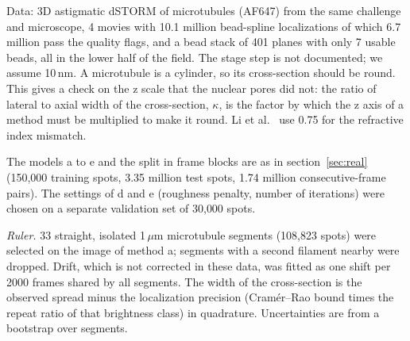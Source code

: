 \documentclass[11pt,a4paper]{article}
\begin{document}
Data: 3D astigmatic dSTORM of microtubules (AF647) from the same challenge and microscope, 4 movies with
10.1 million bead-spline localizations of which 6.7 million pass the quality flags, and a bead stack of 401
planes with only 7 usable beads, all in the lower half of the field. The stage step is not documented; we
assume 10\,nm. A microtubule is a cylinder, so its cross-section should be round. This gives a check on the z
scale that the nuclear pores did not: the ratio of lateral to axial width of the cross-section, $\kappa$, is
the factor by which the z axis of a method must be multiplied to make it round. Li et al.~\cite{cspline} use
0.75 for the refractive index mismatch.

The models a to e and the split in frame blocks are as in section~\ref{sec:real} (150{,}000 training spots,
3.35 million test spots, 1.74 million consecutive-frame pairs). The settings of d and e (roughness penalty,
number of iterations) were chosen on a separate validation set of 30{,}000 spots.

\emph{Ruler.} 33 straight, isolated 1\,$\mu$m microtubule segments (108{,}823 spots) were selected on the image
of method a; segments with a second filament nearby were dropped. Drift, which is not corrected in these data,
was fitted as one shift per 2000 frames shared by all segments. The width of the cross-section is the observed
spread minus the localization precision (Cram\'er--Rao bound times the repeat ratio of that brightness class)
in quadrature. Uncertainties are from a bootstrap over segments.
\end{document}
